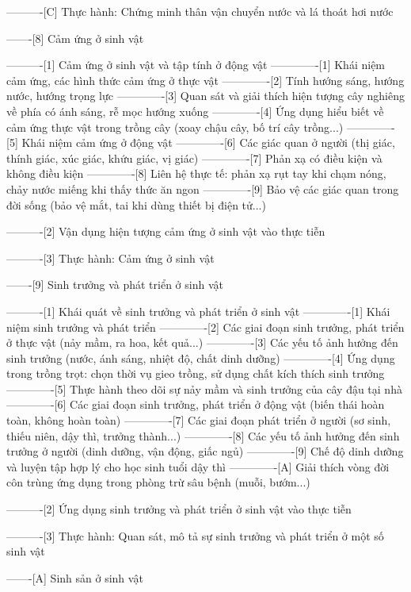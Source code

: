 ----------[C] Thực hành: Chứng minh thân vận chuyển nước và lá thoát hơi nước

-------[8] Cảm ứng ở sinh vật

----------[1] Cảm ứng ở sinh vật và tập tính ở động vật
-------------[1] Khái niệm cảm ứng, các hình thức cảm ứng ở thực vật
-------------[2] Tính hướng sáng, hướng nước, hướng trọng lực
-------------[3] Quan sát và giải thích hiện tượng cây nghiêng về phía có ánh sáng, rễ mọc hướng xuống
-------------[4] Ứng dụng hiểu biết về cảm ứng thực vật trong trồng cây (xoay chậu cây, bố trí cây trồng...)
-------------[5] Khái niệm cảm ứng ở động vật
-------------[6] Các giác quan ở người (thị giác, thính giác, xúc giác, khứu giác, vị giác)
-------------[7] Phản xạ có điều kiện và không điều kiện
-------------[8] Liên hệ thực tế: phản xạ rụt tay khi chạm nóng, chảy nước miếng khi thấy thức ăn ngon
-------------[9] Bảo vệ các giác quan trong đời sống (bảo vệ mắt, tai khi dùng thiết bị điện tử...)

----------[2] Vận dụng hiện tượng cảm ứng ở sinh vật vào thực tiễn

----------[3] Thực hành: Cảm ứng ở sinh vật

-------[9] Sinh trưởng và phát triển ở sinh vật

----------[1] Khái quát về sinh trưởng và phát triển ở sinh vật
-------------[1] Khái niệm sinh trưởng và phát triển
-------------[2] Các giai đoạn sinh trưởng, phát triển ở thực vật (nảy mầm, ra hoa, kết quả...)
-------------[3] Các yếu tố ảnh hưởng đến sinh trưởng (nước, ánh sáng, nhiệt độ, chất dinh dưỡng)
-------------[4] Ứng dụng trong trồng trọt: chọn thời vụ gieo trồng, sử dụng chất kích thích sinh trưởng
-------------[5] Thực hành theo dõi sự nảy mầm và sinh trưởng của cây đậu tại nhà
-------------[6] Các giai đoạn sinh trưởng, phát triển ở động vật (biến thái hoàn toàn, không hoàn toàn)
-------------[7] Các giai đoạn phát triển ở người (sơ sinh, thiếu niên, dậy thì, trưởng thành...)
-------------[8] Các yếu tố ảnh hưởng đến sinh trưởng ở người (dinh dưỡng, vận động, giấc ngủ)
-------------[9] Chế độ dinh dưỡng và luyện tập hợp lý cho học sinh tuổi dậy thì
-------------[A] Giải thích vòng đời côn trùng ứng dụng trong phòng trừ sâu bệnh (muỗi, bướm...)

----------[2] Ứng dụng sinh trưởng và phát triển ở sinh vật vào thực tiễn

----------[3] Thực hành: Quan sát, mô tả sự sinh trưởng và phát triển ở một số sinh vật

-------[A] Sinh sản ở sinh vật


